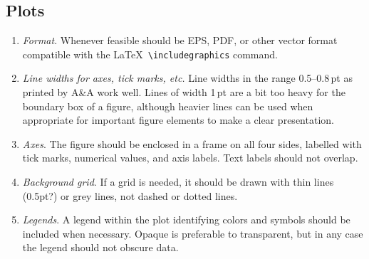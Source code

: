 \documentclass[letterpaper,11pt]{article}
\begin{document}


\subsection{Plots}

\begin{enumerate}
\item {\it Format\/}. Whenever feasible should be EPS, PDF, or other vector format
compatible with the La\TeX\ \verb|\includegraphics| command. 

\item {\it Line widths for axes, tick marks, etc.\/} Line widths in the range 0.5--0.8\,pt 
as printed by A\&A work well.  Lines of width 1\,pt are a bit too heavy for
the boundary box of a figure, although heavier lines can be used when
appropriate for important figure elements to make a clear presentation.  

\item {\it Axes\/}. The figure should be enclosed in a frame on all four
sides, labelled with tick marks, numerical values, and axis labels.  Text
labels should not overlap.


\item {\it Background grid\/}.  If a grid is needed, it should be drawn with
thin lines (0.5pt?) or grey lines, not dashed or dotted lines.

\item {\it Legends\/}.  A legend within the plot identifying colors and
symbols should be included when necessary.  Opaque is preferable to
transparent, but in any case  the legend should not obscure data.
\end{enumerate}
\end{document}
